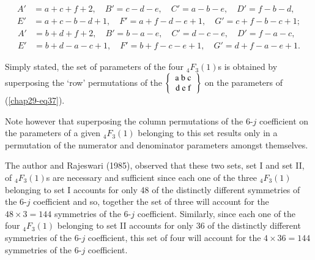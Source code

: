 \begin{equation}
\begin{split}
A' & = a+c+f+2, \quad B'=c-d-e, \quad C'=a-b-e, \quad D'=f-b-d,\\
E' & = a+c-b-d+1, \quad F'=a+f-d-e+1, \quad G'=c+f-b-c+1; \label{chap29-eq40}
\end{split}
\end{equation}
\begin{equation}
\begin{split}
A' & = b+d+f+2, \quad B'=b-a-e, \quad C'=d-c-e, \quad D'=f-a-c,\\
E' & = b+d-a-c+1, \quad F'=b+f-c-e+1, \quad G'=d+f-a-e+1. \label{chap29-eq41}
\end{split}
\end{equation}

Simply stated, the set of parameters of the four $_4F_3(1)$s is obtained by superposing the `row' permutations of the $\left\{ \begin{tabular} {c} a\ b\ c\\ d\ e\ f \\ \end{tabular} \right\}$ on the parameters of (\eqref{chap29-eq37}).

Note however that superposing the column permutations of the 6-$j$ coefficient on the parameters of a given $_4F_3(1)$ belonging to this set results only in a permutation of the numerator and denominator parameters amongst themselves.

The author and Rajeswari (1985), observed that these two sets, set I and set II, of $_4F_3(1)$s are necessary and sufficient since each one of the three $_4F_3(1)$ belonging to set I accounts for only 48 of the distinctly different symmetries of the 6-$j$ coefficient and so, together the set of three will account for the $48\times 3 = 144$ symmetries of the 6-$j$ coefficient. Similarly, since each one of the four $_4F_3(1)$ belonging to set II accounts for only 36 of the distinctly different symmetries of the 6-$j$ coefficient, this set of four will account for the $4\times 36 = 144$ symmetries of the 6-$j$ coefficient.

